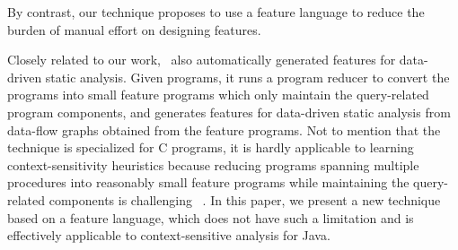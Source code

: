 By contrast, our technique proposes to use a feature language to reduce the burden of manual effort on designing features.



Closely related to our work, \citet{ChOhHeYa17}~also automatically generated features for data-driven static analysis.
Given programs, it runs a program reducer to convert the programs into small feature programs which only maintain the query-related program components,
and generates features for data-driven static analysis from data-flow graphs obtained from the feature programs.
Not to mention that the technique is specialized for C programs, it is hardly applicable to learning context-sensitivity heuristics because reducing programs spanning multiple procedures into reasonably small feature programs while maintaining the query-related components is challenging~\cite{ChOhHeYa17} . In this paper, we present a new technique based on  a feature language, which does not have such a limitation and is effectively applicable to context-sensitive analysis for Java.



